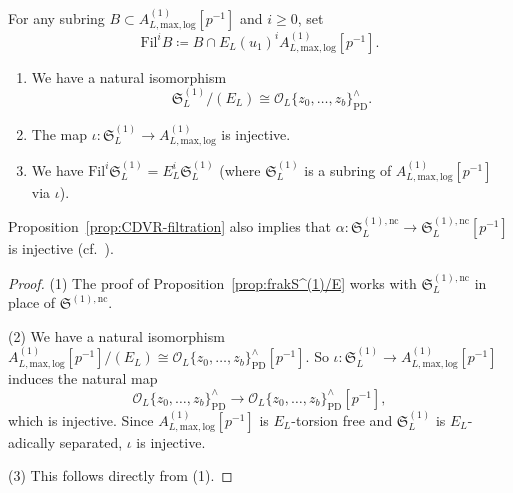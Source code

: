 For any subring $B \subset A^{(1)}_{L,\mathrm{max, log}}[p^{-1}]$ and $i \geq 0$, set 
\[
\mathrm{Fil}^i B \coloneqq B \cap E_L(u_1)^i A^{(1)}_{L, \mathrm{max, log}}[p^{-1}].
\]

\begin{prop} \label{prop:CDVR-filtration} \hfill
\begin{enumerate}
\item We have a natural isomorphism
\[
\mathfrak{S}_L^{(1)}/(E_L) \cong \mathcal{O}_L \{z_0,\ldots,z_b\}^\wedge_\mathrm{PD}.
\]

\item The map $\iota\colon \mathfrak{S}_L^{(1)} \rightarrow A^{(1)}_{L, \mathrm{max, log}}$ is injective.

\item We have $\mathrm{Fil}^i \mathfrak{S}_L^{(1)} = E_L^i \mathfrak{S}_L^{(1)}$ (where $\mathfrak{S}_L^{(1)}$ is a subring of $A^{(1)}_{L, \mathrm{max, log}}[p^{-1}]$ via $\iota$).
\end{enumerate}    
\end{prop}

Proposition~\ref{prop:CDVR-filtration} also implies that $\alpha\colon\mathfrak{S}_L^{(1), \mathrm{nc}} \rightarrow \mathfrak{S}_L^{(1), \mathrm{nc}}[p^{-1}]$ is injective (cf.~\cite[\S2.2]{du-liu-prismaticphiGhatmodule}).

\begin{proof}
(1) The proof of Proposition~\ref{prop:frakS^(1)/E} works with $\mathfrak{S}_L^{(1), \mathrm{nc}}$ in place of $\mathfrak{S}^{(1), \mathrm{nc}}$.

(2) We have a natural isomorphism $A^{(1)}_{L, \mathrm{max, log}}[p^{-1}]/(E_L) \cong \mathcal{O}_L \{z_0,\ldots,z_b\}^\wedge_\mathrm{PD}[p^{-1}]$. So $\iota\colon \mathfrak{S}_L^{(1)} \rightarrow A^{(1)}_{L, \mathrm{max, log}}[p^{-1}]$ induces the natural map
\[
\mathcal{O}_L \{z_0,\ldots,z_b \}^\wedge_\mathrm{PD} \rightarrow \mathcal{O}_L \{z_0,\ldots,z_b \}^\wedge_\mathrm{PD}[p^{-1}],
\]
which is injective. Since $A^{(1)}_{L, \mathrm{max, log}}[p^{-1}]$ is $E_L$-torsion free and $\mathfrak{S}_L^{(1)}$ is $E_L$-adically separated, $\iota$ is injective.

(3) This follows directly from (1).
\end{proof}



